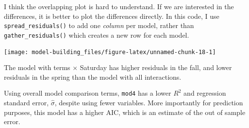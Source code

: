 \documentclass[]{book}
\newenvironment{Shaded}{\begin{snugshade}}{\end{snugshade}}
\newcommand{\CommentTok}[1]{\textcolor[rgb]{0.56,0.35,0.01}{\textit{#1}}}
\newcommand{\DataTypeTok}[1]{\textcolor[rgb]{0.13,0.29,0.53}{#1}}
\newcommand{\FloatTok}[1]{\textcolor[rgb]{0.00,0.00,0.81}{#1}}
\newcommand{\KeywordTok}[1]{\textcolor[rgb]{0.13,0.29,0.53}{\textbf{#1}}}
\newcommand{\NormalTok}[1]{#1}
\newcommand{\OperatorTok}[1]{\textcolor[rgb]{0.81,0.36,0.00}{\textbf{#1}}}
\newcommand{\StringTok}[1]{\textcolor[rgb]{0.31,0.60,0.02}{#1}}
\theoremstyle{plain}
\theoremstyle{remark}
\begin{document}
I think the overlapping plot is hard to understand.
If we are interested in the differences, it is better to plot the differences directly.
In this code, I use \texttt{spread\_residuals()} to add one \emph{column} per model, rather than \texttt{gather\_residuals()} which creates a new row for each model.

\begin{Shaded}
\end{Shaded}

\begin{center}\texttt{[image: model-building\_files/figure-latex/unnamed-chunk-18-1]} \end{center}

The model with terms × Saturday has higher residuals in the fall, and lower residuals in the spring than the model with all interactions.

Using overall model comparison terms, \texttt{mod4} has a lower \(R^2\) and regression standard error, \(\hat{\sigma}\), despite using fewer variables.
More importantly for prediction purposes, this model has a higher AIC, which is an estimate of the out of sample error.

\begin{Shaded}
\end{Shaded}

\begin{Shaded}
\end{Shaded}
\end{document}
